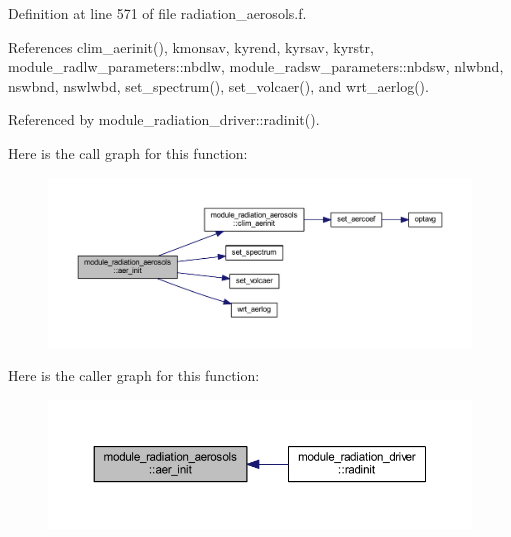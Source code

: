 Definition at line 571 of file radiation\+\_\+aerosols.\+f.



References clim\+\_\+aerinit(), kmonsav, kyrend, kyrsav, kyrstr, module\+\_\+radlw\+\_\+parameters\+::nbdlw, module\+\_\+radsw\+\_\+parameters\+::nbdsw, nlwbnd, nswbnd, nswlwbd, set\+\_\+spectrum(), set\+\_\+volcaer(), and wrt\+\_\+aerlog().



Referenced by module\+\_\+radiation\+\_\+driver\+::radinit().



Here is the call graph for this function\+:
\nopagebreak
\begin{figure}[H]
\begin{center}
\leavevmode
\includegraphics[width=350pt]{group__module__radiation__aerosols_gabe52f1b6f62b158154e70a7b5058ad20_cgraph}
\end{center}
\end{figure}




Here is the caller graph for this function\+:
\nopagebreak
\begin{figure}[H]
\begin{center}
\leavevmode
\includegraphics[width=350pt]{group__module__radiation__aerosols_gabe52f1b6f62b158154e70a7b5058ad20_icgraph}
\end{center}
\end{figure}


